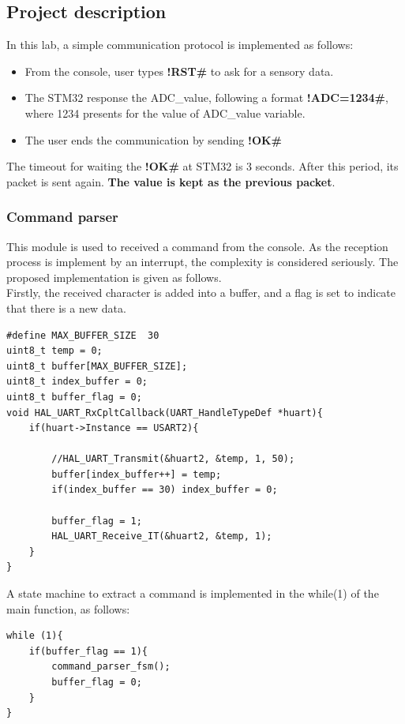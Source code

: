 \subsection{Project description}
In this lab, a simple communication protocol is implemented as follows:
\begin{itemize}
    \item From the console, user types \textbf{!RST\#} to ask for a sensory data.
    \item The STM32 response the ADC\_value, following a format \textbf{!ADC=1234\#}, where 1234 presents for the value of ADC\_value variable.
    \item The user ends the communication by sending \textbf{!OK\#}
\end{itemize}

The timeout for waiting the \textbf{!OK\#} at STM32 is 3 seconds. After this period, its packet is sent again. \textbf{The value is kept as the previous packet}.

\subsubsection{Command parser}
This module is used to received a command from the console. As the reception process is implement by an interrupt, the complexity is considered seriously. The proposed implementation is given as follows.\\

Firstly, the received character is added into a buffer, and a flag is set to indicate that there is a new data.

\begin{lstlisting}[caption= Add the received character into a buffer]
#define MAX_BUFFER_SIZE  30
uint8_t temp = 0;
uint8_t buffer[MAX_BUFFER_SIZE];
uint8_t index_buffer = 0;
uint8_t buffer_flag = 0;
void HAL_UART_RxCpltCallback(UART_HandleTypeDef *huart){
	if(huart->Instance == USART2){

		//HAL_UART_Transmit(&huart2, &temp, 1, 50);
		buffer[index_buffer++] = temp;
		if(index_buffer == 30) index_buffer = 0;

		buffer_flag = 1;
		HAL_UART_Receive_IT(&huart2, &temp, 1);
	}
}
\end{lstlisting}

A state machine to extract a command is implemented in the while(1) of the main function, as follows:
\begin{lstlisting}[caption= State machine to extract the command]
while (1){
    if(buffer_flag == 1){
        command_parser_fsm();
        buffer_flag = 0;
    }
}
\end{lstlisting}

